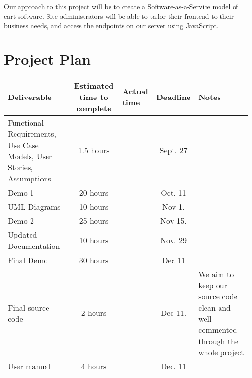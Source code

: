 \documentclass[10pt,letter]{article}
\begin{document}
\par Our approach to this project will be to create a Software-as-a-Service model of cart software. Site administrators will be able to tailor their frontend to their business needs, and access the endpoints on our server using JavaScript.

\section*{Project Plan}
\begin{tabularx}{\textwidth}{X | c | X | c | X }
    \hline
    Deliverable & Estimated time to complete & Actual time & Deadline & Notes \\
    \hline
    Functional Requirements, Use Case Models, User Stories, Assumptions & 1.5 hours & & Sept. 27 & \\
    \hline
    Demo 1 & 20 hours & & Oct. 11 & \\
    \hline
    UML Diagrams & 10 hours & & Nov 1. & \\
    \hline
    Demo 2 & 25 hours & & Nov 15. & \\
    \hline
    Updated Documentation & 10 hours & & Nov. 29  & \\
    \hline
    Final Demo & 30 hours & & Dec 11 & \\
    \hline
    Final source code & 2 hours & & Dec 11. & We aim to keep our source code clean and well commented through the whole project \\
    \hline
    User manual & 4 hours & & Dec. 11 & \\
    \hline
\end{tabularx}
\end{document}

